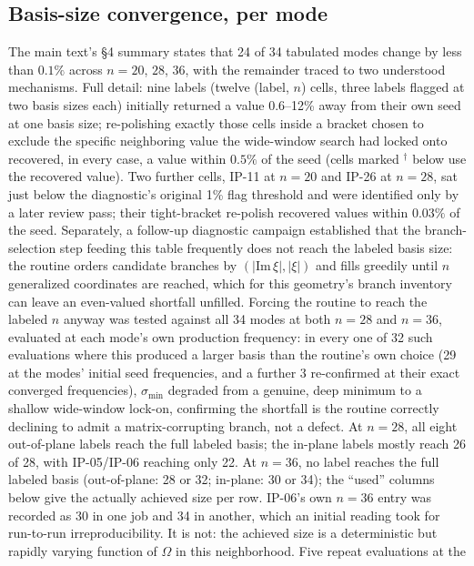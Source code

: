 \documentclass[11pt]{article}
\begin{document}
\subsection{Basis-size convergence, per mode}\label{sec:conv-appendix}
The main text's \S4 summary states that 24 of 34 tabulated modes change by
less than $0.1\%$ across $n=20$, $28$, $36$, with the remainder traced to
two understood mechanisms. Full detail: nine labels (twelve (label, $n$)
cells, three labels flagged at two basis sizes each) initially returned a
value 0.6--12\% away from their own seed at one basis size; re-polishing
exactly those cells inside a bracket chosen to exclude the specific
neighboring value the wide-window search had locked onto recovered, in
every case, a value within $0.5\%$ of the seed (cells marked $^\dagger$
below use the recovered value). Two further cells, IP-11 at $n{=}20$
and IP-26 at $n{=}28$, sat just below the diagnostic's original 1\%
flag threshold and were identified only by a later review pass; their
tight-bracket re-polish recovered values within $0.03\%$ of the seed.
Separately, a follow-up diagnostic campaign established that the
branch-selection step feeding this table frequently does not reach the
labeled basis size: the routine orders candidate branches by
$(|\mathrm{Im}\,\xi|,|\xi|)$ and fills greedily until $n$ generalized
coordinates are reached, which for this geometry's branch inventory can
leave an even-valued shortfall unfilled. Forcing the routine to reach the
labeled $n$ anyway was tested against all 34 modes at both $n{=}28$ and
$n{=}36$, evaluated at each mode's own production frequency: in every
one of 32 such evaluations where this produced a larger basis than the
routine's own choice (29 at the modes' initial seed frequencies, and a
further 3 re-confirmed at their exact converged frequencies),
$\sigma_{\min}$ degraded from a genuine, deep minimum to a shallow
wide-window lock-on, confirming the shortfall is the routine correctly
declining to admit a matrix-corrupting branch, not a defect. At $n{=}28$, all eight
out-of-plane labels reach the full labeled basis; the in-plane labels
mostly reach 26 of 28, with IP-05/IP-06 reaching only 22. At $n{=}36$, no
label reaches the full labeled basis (out-of-plane: 28 or 32; in-plane:
30 or 34); the ``used'' columns below give the actually achieved size
per row. IP-06's own $n{=}36$ entry was recorded as 30 in one job and 34
in another, which an initial reading took for run-to-run irreproducibility.
It is not: the achieved size is a deterministic but rapidly varying
function of $\Omega$ in this neighborhood. Five repeat evaluations at the
\end{document}
